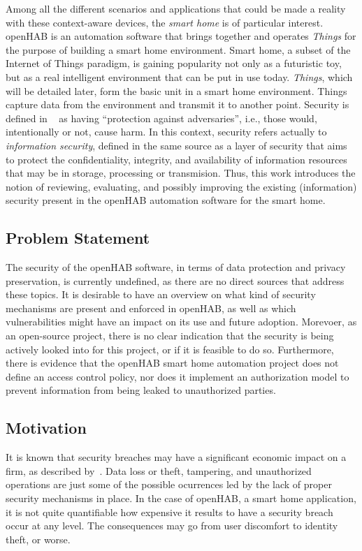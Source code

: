 \documentclass[12pt]{article}
\begin{document}
Among all the different scenarios and applications that could be made a reality with these context-aware devices, the \emph{smart home} is of particular interest. openHAB is an automation software that brings together and operates \emph{Things} for the purpose of building a smart home environment. Smart home, a subset of the Internet of Things paradigm, is gaining popularity not only as a futuristic toy, but as a real intelligent environment that can be put in use today. \emph{Things}, which will be detailed later, form the basic unit in a smart home environment. Things capture data from the environment and transmit it to another point. Security is defined in ~\cite{whitman2011principles} as having ``protection against adversaries'', i.e., those would, intentionally or not, cause harm. In this context, security refers actually to \emph{information security}, defined in the same source as a layer of security that aims to protect the confidentiality, integrity, and availability of information resources that may be in storage, processing or transmision. Thus, this work introduces the notion of reviewing, evaluating, and possibly improving the existing (information) security present in the openHAB automation software for the smart home.

\subsection{Problem Statement}

The security of the openHAB software, in terms of data protection and privacy preservation, is currently undefined, as there are no direct sources that address these topics. It is desirable to have an overview on what kind of security mechanisms are present and enforced in openHAB, as well as which vulnerabilities might have an impact on its use and future adoption. Morevoer, as an open-source project, there is no clear indication that the security is being actively looked into for this project, or if it is feasible to do so. Furthermore, there is evidence that the openHAB smart home automation project does not define an access control policy, nor does it implement an authorization model to prevent information from being leaked to unauthorized parties. 

\subsection{Motivation}

It is known that security breaches may have a significant economic impact on a firm, as described by~\cite{GOEL}. Data loss or theft, tampering, and unauthorized operations are just some of the possible ocurrences led by the lack of proper security mechanisms in place. In the case of openHAB, a smart home application, it is not quite quantifiable how expensive it results to have a security breach occur at any level. The consequences may go from user discomfort to identity theft, or worse.
\end{document}
